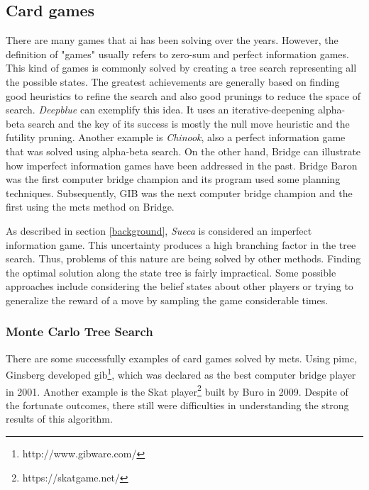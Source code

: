 \subsection{Card games}
 
 
There are many games that \gls{ai} has been solving over the years.
However, the definition of "games" usually refers to zero-sum and perfect information games.
This kind of games is commonly solved by creating a tree search representing all the possible states.
The greatest achievements are generally based on finding good heuristics to refine the search and also good prunings to reduce the space of search.
\emph{Deepblue} can exemplify this idea.
It uses an iterative-deepening alpha-beta search and the key of its success is mostly the null move heuristic and the futility pruning.
Another example is \emph{Chinook}, also a perfect information game that was solved using alpha-beta search.
On the other hand, Bridge can illustrate how imperfect information games have been addressed in the past.
Bridge Baron was the first computer bridge champion and its program used some planning techniques.
Subsequently, GIB was the next computer bridge champion and the first using the \gls{mcts} method on Bridge.


As described in section \ref{background}, \emph{Sueca} is considered an imperfect information game.
This uncertainty produces a high branching factor in the tree search.
Thus, problems of this nature are being solved by other methods.
Finding the optimal solution along the state tree is fairly impractical.
Some possible approaches include considering the belief states about other players or trying to generalize the reward of a move by sampling the game considerable times.



\subsubsection{Monte Carlo Tree Search}


There are some successfully examples of card games solved by \gls{mcts}.
Using \gls{pimc}, Ginsberg developed \gls{gib}\footnote{http://www.gibware.com/}, which was declared as the best computer bridge player in 2001.
Another example is the Skat player\footnote{https://skatgame.net/} built by Buro in 2009.
Despite of the fortunate outcomes, there still were difficulties in understanding the strong results of this algorithm.


